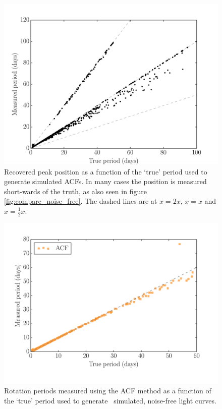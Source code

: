 \begin{figure}
\begin{center}
\includegraphics[width=6in, clip=true]{figures/exp_sine_test.pdf}
\caption[A flaw in the ACF method.]
{Recovered peak position as a function of the `true' period used to
generate simulated ACFs. In many cases the position is measured short-wards of
the truth, as also seen in figure \ref{fig:compare_noise_free}. The dashed
lines are at $x=2x$, $x=x$ and $x=\frac{1}{2}x$.}
\end{center}
\end{figure}
\label{fig:exp_sine_test}

\begin{figure}
\begin{center}
\includegraphics[width=6in, clip=true]{figures/compare_acf.pdf}
\caption[ACF results.]
{Rotation periods measured using the ACF method as a function of the
`true' period used to generate \nlightcurves\ simulated, noise-free light
curves.}
\end{center}
\end{figure}
\label{fig:compare_noise_free}

